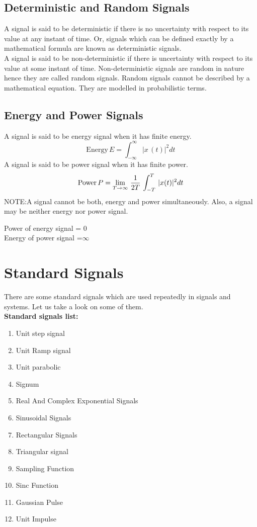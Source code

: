 \documentclass[a4paper,12pt]{book}
\begin{document}
\subsection*{\Large{Deterministic and Random Signals }}
A signal is said to be deterministic if there is no uncertainty with respect to its value at any instant of time. Or, signals which can be defined exactly by a mathematical formula are known as deterministic signals.\\

A signal is said to be non-deterministic if there is uncertainty with respect to its value at some instant of time. Non-deterministic signals are random in nature hence they are called random signals. Random signals cannot be described by a mathematical equation. They are modelled in probabilistic terms.\\
\subsection*{\Large{Energy and Power Signals }}
A signal is said to be energy signal when it has finite energy.
$$\text{Energy}\, E = \int_{-\infty}^{\infty} |x\,(t)|^2dt$$
A signal is said to be power signal when it has finite power.
$$\text{Power}\, P = \lim_{T \to \infty}\,{1\over2T}\,\int_{-T}^{T}\,|x(t)|^2dt$$
NOTE:A signal cannot be both, energy and power simultaneously. Also, a signal may be neither energy nor power signal.

\begingroup
\centering

Power of energy signal = 0\\
Energy of power signal =$\infty$

\endgroup
\pagebreak
\section{Standard Signals}
There are some standard signals which are used repeatedly in signals and systems. Let us take a look on some of them.\vspace{4mm}\\
{\bf Standard signals list:}
\begin{enumerate}
\item Unit step signal
\item Unit Ramp signal
\item Unit parabolic
\item Signum
\item Real And Complex Exponential Signals
\item Sinusoidal Signals
\item Rectangular Signals
\item Triangular signal
\item Sampling Function
\item Sinc Function
\item Gaussian Pulse
\item Unit Impulse
\end{enumerate}
\end{document}
